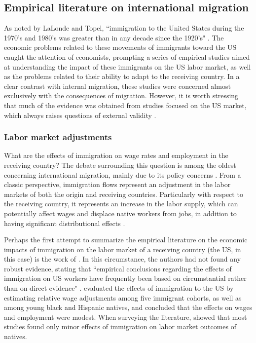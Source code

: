 \subsection{Empirical literature on international migration} \label{lit_review_empirical_international}

As noted by LaLonde and Topel, ``immigration to the United States during the 1970's and 1980's was greater than in any decade since the 1920's" \citep[p. 297]{lalonde_immigrants_1991}. The economic problems related to these movements of immigrants toward the US caught the attention of economists, prompting a series of empirical studies aimed at understanding the impact of these immigrants on the US labor market, as well as the problems related to their ability to adapt to the receiving country. In a clear contrast with internal migration, these studies were concerned almost exclusively with the consequences of migration. However, it is worth stressing that much of the evidence was obtained from studies focused on the US market, which always raises questions of external validity \citep{greenwood_factor_1986, lalonde_economic_1997}.

\subsubsection{Labor market adjustments}

What are the effects of immigration on wage rates and employment in the receiving country? The debate surrounding this question is among the oldest concerning international migration, mainly due to its policy concerns \citep{greenwood_factor_1986}. From a classic perspective, immigration flows represent an adjustment in the labor markets of both the origin and receiving countries. Particularly with respect to the receiving country, it represents an increase in the labor supply, which can potentially affect wages and displace native workers from jobs, in addition to having significant distributional effects \citep{greenwood_factor_1986, lalonde_immigrants_1991, lalonde_labor_1991, lalonde_economic_1997}. 

Perhaps the first attempt to summarize the empirical literature on the economic impacts of immigration on the labor market of a receiving country (the US, in this case) is the work of \cite{greenwood_factor_1986}. In this circumstance, the authors had not found any robust evidence, stating that ``empirical conclusions regarding the effects of immigration on US workers have frequently been based on circumstantial rather than on direct evidence" \citep[p. 1767]{greenwood_factor_1986}. \cite{lalonde_labor_1991} evaluated the effects of immigration to the US by estimating relative wage adjustments among five immigrant cohorts, as well as among young black and Hispanic natives, and concluded that the effects on wages and employment were modest. When surveying the literature, \cite{lalonde_economic_1997} showed that most studies found only minor effects of immigration on labor market outcomes of natives.

